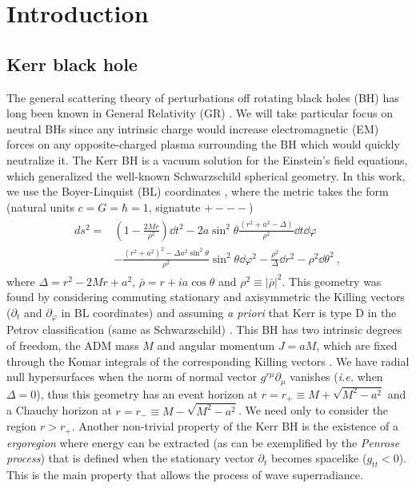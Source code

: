 
\section{Introduction}
\label{Section1}

\subsection{Kerr black hole}

The general scattering theory of perturbations off rotating black holes (BH) has long been known in General Relativity (GR) \cite{Futterman1988}.
We will take particular focus on neutral BHs since any intrinsic charge would increase electromagnetic (EM) forces on any opposite-charged plasma surrounding the BH which would quickly neutralize it.
The Kerr BH is a vacuum solution for the Einstein's field equations, which generalized the well-known Schwarzschild spherical geometry.
In this work, we use the Boyer-Linquist (BL) coordinates \cite{Boyer1967}, where the metric takes the form (natural units $c=G=\hbar=1$, signatute $+---$)
\begin{align}
\begin{split}
    ds^2 =& \left(1 - \frac{2 M r}{\rho^2} \right) \dd t^2 - 2 a \sin^2\theta \frac{(r^2+a^2-\Delta)}{\rho^2} \dd t \dd \varphi \\
    &- \frac{(r^2+a^2)^2- \Delta a^2 \sin^2\theta }{\rho^2} \sin^2\theta \dd\varphi^2 - \frac{\rho^2}{\Delta} \dd r^2 - \rho^2 \dd \theta^2 ~,
\end{split}
\end{align}
where $\Delta=r^2-2 M r +a^2$, $\bar{\rho} = r + i a \cos\theta$ and $\rho^2 \equiv |\bar{\rho}|^2$.
This geometry was found by considering commuting stationary and axisymmetric the Killing vectors ($\partial_t$ and $\partial_\varphi$ in BL coordinates) and assuming \emph{a priori} that Kerr is type D in the Petrov classification (same as Schwarzschild) \cite{Chandrasekhar1998, Wald2010}.
This BH has two intrinsic degrees of freedom, the ADM mass $M$ and angular momentum $J = a M$, which are fixed through the Komar integrals of the corresponding Killing vectors \cite{Heusler1996}.
We have radial null hypersurfaces when the norm of normal vector $g^{r \mu} \partial_\mu$ vanishes (\emph{i.e.} when $\Delta=0$), thus this geometry has an event horizon at $r=r_{+} \equiv M + \sqrt{M^2-a^2}$ and a Chauchy horizon at $r=r_{-}\equiv M - \sqrt{M^2-a^2}$. We need only to consider the region $r>r_{+}$.
Another non-trivial property of the Kerr BH is the existence of a \emph{ergoregion} where energy can be extracted (as can be exemplified by the \emph{Penrose process}) that is defined when the stationary vector $\partial_t$ becomes spacelike ($g_{tt}<0$). This is the main property that allows the process of wave superradiance. \cite{Townsend1997}

